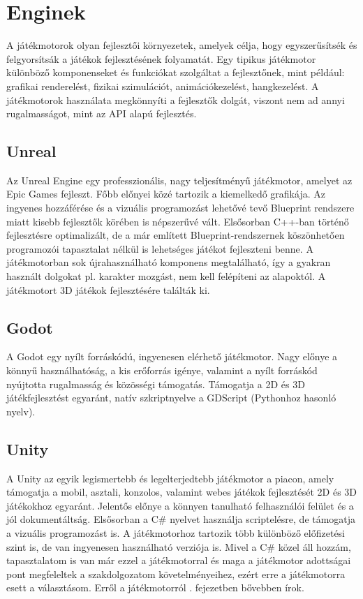 \documentclass[]{thesis-ekf}
\theoremstyle{definition}
\theoremstyle{remark}
\begin{document}
\section{Enginek}

A játékmotorok olyan fejlesztői környezetek, amelyek célja, hogy egyszerűsítsék és felgyorsítsák a játékok fejlesztésének folyamatát. Egy tipikus játékmotor különböző komponenseket és funkciókat szolgáltat a fejlesztőnek, mint például: grafikai renderelést, fizikai szimulációt, animációkezelést, hangkezelést. A játékmotorok használata megkönnyíti a fejlesztők dolgát, viszont nem ad annyi rugalmasságot, mint az API alapú fejlesztés.

\subsection{Unreal}

Az Unreal Engine egy professzionális, nagy teljesítményű játékmotor, amelyet az Epic Games fejleszt. Főbb előnyei közé tartozik a kiemelkedő grafikája. Az ingyenes hozzáférése és a vizuális programozást lehetővé tevő Blueprint rendszere miatt kisebb fejlesztők körében is népszerűvé vált. Elsősorban C++-ban történő fejlesztésre optimalizált, de a már említett Blueprint-rendszernek köszönhetően programozói tapasztalat nélkül is lehetséges játékot fejleszteni benne. A játékmotorban sok újrahasználható komponens megtalálható, így a gyakran használt dolgokat pl. karakter mozgást, nem kell felépíteni az alapoktól. A játékmotort 3D játékok fejlesztésére találták ki. \cite{UnrealEngine}

\subsection{Godot}

A Godot egy nyílt forráskódú, ingyenesen elérhető játékmotor. Nagy előnye a könnyű használhatóság, a kis erőforrás igénye, valamint a nyílt forráskód nyújtotta rugalmasság és közösségi támogatás. Támogatja a 2D és 3D játékfejlesztést egyaránt, natív szkriptnyelve a GDScript (Pythonhoz hasonló nyelv). \cite{Godot} \cite{GitHubGodot}

\subsection{Unity}

A Unity az egyik legismertebb és legelterjedtebb játékmotor a piacon, amely támogatja a mobil, asztali, konzolos, valamint webes játékok fejlesztését 2D és 3D játékokhoz egyaránt. Jelentős előnye a könnyen tanulható felhasználói felület és a jól dokumentáltság. Elsősorban a C\# nyelvet használja scriptelésre, de támogatja a vizuális programozást is. A játékmotorhoz tartozik több különböző előfizetési szint is, de van ingyenesen használható verziója is.  Mivel a C\# közel áll hozzám, tapasztalatom is van már ezzel a játékmotorral és maga a játékmotor adottságai pont megfeleltek a szakdolgozatom követelményeihez, ezért erre a játékmotorra esett a választásom. Erről a játékmotorról . fejezetben bővebben írok. \cite{Unity}
\end{document}
